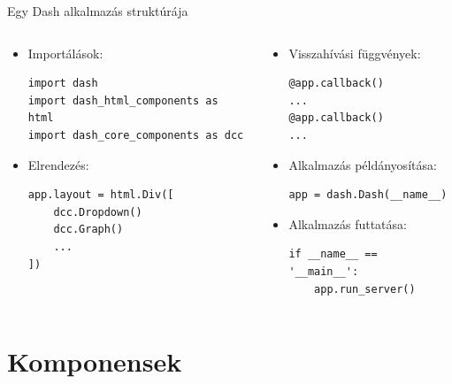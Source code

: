 \documentclass[english, aspectratio=169]{beamer}
\makeatletter
\let\origtableofcontents=\tableofcontents
\def\tableofcontents{\@ifnextchar[{\origtableofcontents}{\gobbletableofcontents}}
\def\gobbletableofcontents#1{\origtableofcontents}
\makeatother
\begin{document}
\begin{frame}[fragile]{Egy Dash alkalmazás struktúrája}
	\begin{columns}
		\begin{column}{.5\textwidth}
			\begin{itemize}
				\item Importálások:
					\begin{lstlisting}
import dash
import dash_html_components as html
import dash_core_components as dcc
					\end{lstlisting}
				\item Elrendezés:
					\begin{lstlisting}
app.layout = html.Div([
	dcc.Dropdown()
	dcc.Graph()
	...
])
					\end{lstlisting}
			\end{itemize}
		\end{column}
		\begin{column}{.5\textwidth}
			\begin{itemize}
				\item Visszahívási függvények:
					\begin{lstlisting}
@app.callback()
...
@app.callback()
...
					\end{lstlisting}
				\item Alkalmazás példányosítása:
					\begin{lstlisting}
app = dash.Dash(__name__)
					\end{lstlisting}
				\item Alkalmazás futtatása:
					\begin{lstlisting}
if __name__ == '__main__':
	app.run_server()
					\end{lstlisting}
			\end{itemize}
		\end{column}
	\end{columns}
\end{frame}

\section{Komponensek}

\begin{frame}
	\tableofcontents[currentsection]
\end{frame}
\end{document}

